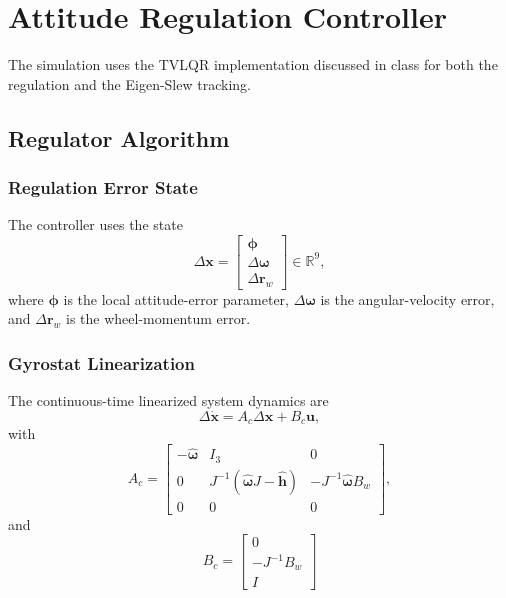 \documentclass[conference,onecolumn,draftclsnofoot]{IEEEtran}
\begin{document}
\clearpage
\section{Attitude Regulation Controller}

The simulation uses the TVLQR implementation discussed in class for both the regulation and the Eigen-Slew tracking.
\subsection{Regulator Algorithm}
\subsubsection{Regulation Error State}

The controller uses the state
\begin{equation}
\Delta \mathbf x
=
\begin{bmatrix}
\boldsymbol{\phi}\\
\Delta\boldsymbol{\omega}\\
\Delta\mathbf r_w
\end{bmatrix}
\in\mathbb R^9,
\end{equation}
where \(\boldsymbol{\phi}\) is the local attitude-error parameter,
\(\Delta\boldsymbol{\omega}\) is the angular-velocity error, and
\(\Delta\mathbf r_w\) is the wheel-momentum error.

\subsubsection{Gyrostat Linearization}

The continuous-time linearized system dynamics are
\begin{equation}
\Delta\dot{\mathbf x}
=
A_c\Delta\mathbf x
+
B_c\mathbf u,
\end{equation}
with
\begin{equation}
A_c
=
\begin{bmatrix}
-\hat{\boldsymbol{\omega}}
&
I_3
&
0\\
0
&
J^{-1}
\left(
\hat{\boldsymbol{\omega}}J-\hat{\mathbf h}
\right)
&
-J^{-1}\hat{\boldsymbol{\omega}}B_w\\
0
&
0
&
0
\end{bmatrix},
\end{equation}
and
\begin{equation}
B_c
=
\begin{bmatrix}
0\\
-J^{-1}B_w\\
I
\end{bmatrix}
\end{equation}
\end{document}
